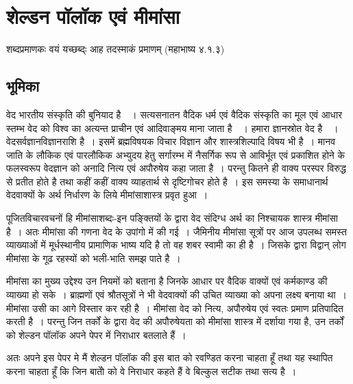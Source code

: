 {\fontsize{11}{13}\selectfont
\chapter[{\dev शेल्डन पॉलॉक एवं मीमांसा}]{{\dev शेल्डन पॉलॉक एवं मीमांसा}}\label{chapter\thechapter:begin}



शब्दप्रमाणकः वयं यच्छब्द्ः आह तदस्माकं प्रमाणम् (महाभाष्य ४.१.३)

\section*{भूमिका}

वेद भारतीय संस्कृति की बुनियाद है~~। सत्यसनातन वैदिक धर्म एवं वैदिक संस्कृति का मूल एवं आधार स्तम्भ वेद को विश्व का अत्यन्त प्राचीन एवं आदिवाङ्मय माना जाता है~~। हमारा ज्ञानस्रोत वेद है~~। वेदसर्वज्ञानविज्ञानराशि है~। इसमें ब्रह्मविषयक विचार विज्ञान और शास्त्रशिल्पादि विषय भी है~। मानव जाति के लौकिक एवं पारलौकिक अभ्युदय हेतु सर्गारम्भ में नैसर्गिक रूप से आविर्भूत एवं प्रकाशित होने के फलस्वरूप वेदज्ञान को अनादि नित्य एवं अपौरुषेय कहा जाता है~। परन्तु कितने ही वाक्य परस्पर विरुद्ध से प्रतीत होते है तथा कहीं कहीं वाक्य व्याहतार्थ से दृष्टिगोचर होते है~। इस समस्या के समाधानार्थ वेदवाक्यों के अर्थ निर्धारण के लिये मीमांसाशास्त्र प्रवृत हुआ~।

पूजितविचारवचनों हि मीमांसाशब्दः-इन पङ्क्तियों के द्वारा वेद संदिग्ध अर्थ का निश्चायक शास्त्र मीमांसा है~। अतः मीमांसा की गणना वेद के उपांगो में की गई~। जैमिनीय मीमांसा सूत्रों पर आज उपलब्ध समस्त व्याख्याओं में मूर्धस्थानीय प्रामाणिक भाष्य यदि है तो वह शबर स्वामी का ही है~। जिसके द्वारा विद्वान् लोग मीमांसा के गूढ रहस्यों को भली-भाति समझ पाते है~। 

मीमांसा का मुख्य उद्देश्य उन नियमों को बताना है जिनके आधार पर वैदिक वाक्यों एवं कर्मकाण्ड की व्याख्या हो सके~। ब्राह्मणों एवं श्रौतसूत्रों ने भी वेदवाक्यों की उचित व्याख्या को अपना लक्ष्य बनाया था~। मीमांसा उसी का आगे विस्तार कर रही है~। मीमांसा वेद को नित्य, अपौरुषेय एवं स्वतः प्रमाण प्रतिपादित करती है~। परन्तु जिन तर्कों के द्वारा वेद की अपौरुषेयता को मीमांसा शास्त्र में दर्शाया गया है, उन तर्कों को शेल्डन पॉलॉक अपने पेपर {} में निराधार बतलाते हैं~।

अतः अपने इस पेपर मे मैं शेल्डन पॉलॉक की इस बात को रवण्डित करना चाहता हूँ तथा यह स्थापित करना चाहता हूँ कि जिन बातोें को वे निराधार कहते हैं वे बिल्कुल सटीक तथा सत्य है~।

}
